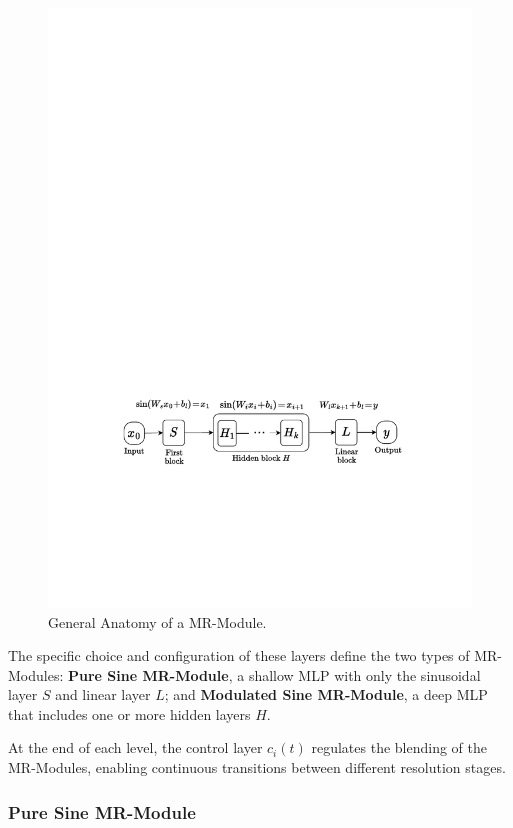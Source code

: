 \begin{figure}[!h]
    \centering
    \includegraphics[width=0.9\linewidth]{img/ch4/diagram_mr_module.pdf}
    \caption{General Anatomy of a MR-Module.}
    \label{f:mr-module}
\end{figure}

The specific choice and configuration of these layers define the two types of MR-Modules: \textbf{Pure Sine MR-Module}, a shallow MLP with only the sinusoidal layer \( S \) and linear layer \( L \); and \textbf{Modulated Sine MR-Module}, a deep MLP that includes one or more hidden layers \( H \).

At the end of each level, the control layer \( c_i(t) \) regulates the blending of the MR-Modules, enabling continuous transitions between different resolution stages.

\subsubsection{Pure Sine MR-Module}

